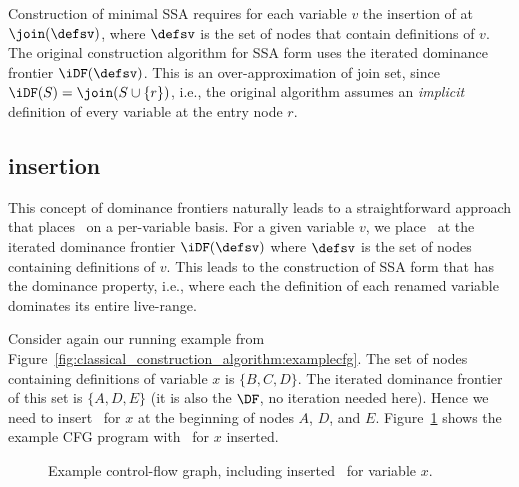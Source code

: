 {Construction of minimal SSA requires for each variable $v$ the insertion of \phifuns at $\join(\defsv)$, where $\defsv$ is the set of nodes that contain definitions of $v$. 
The original construction algorithm for SSA form uses the iterated dominance frontier $\iDF(\defsv)$. 
This is an over-approximation of join set, since $\iDF(S)=\join(S\cup \{r\})$, i.e., the original algorithm assumes an \emph{implicit} definition of every variable at the entry node $r$.


\subsection{\phifun insertion}
\label{sec:classical_construction_algorithm:phiinsertion}
This concept of dominance frontiers naturally leads to a straightforward approach that places \phifuns\ on a per-variable basis. 
For a given variable $v$, we place \phifuns\ at the iterated dominance frontier $\iDF(\defsv)$ where $\defsv$ is the set of nodes containing definitions of $v$. 
This leads to the construction of SSA form that has the dominance property, i.e., where each the definition of each renamed variable dominates its entire live-range.

Consider again our running example from Figure~\ref{fig:classical_construction_algorithm:examplecfg}. 
The set of nodes containing definitions of variable $x$ is $\{ B,C,D \}$. 
The iterated dominance frontier of this set is $\{ A, D, E \}$ (it is also the $\DF$, no iteration needed here). 
Hence we need to insert \phifuns\ for $x$ at the beginning of nodes $A$, $D$, and $E$. 
Figure~\ref{fig:classical_construction_algorithm:examplecfg_varx} shows the example CFG program with \phifuns\ for $x$ inserted.

\begin{figure}
\caption{\label{fig:classical_construction_algorithm:examplecfg_varx}Example control-flow graph, including
inserted \phifuns\ for variable $x$.
}
\end{figure}



}

